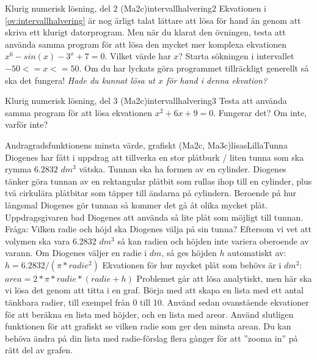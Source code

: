 \begin{matteovnings}{Klurig numerisk lösning, del 2 (Ma2c)}{intervallhalvering2}
Ekvationen i \autoref{ov:intervallhalvering} är nog ärligt talat lättare att lösa för hand än genom att skriva ett klurigt datorprogram. Men när du klarat den övningen, testa att använda samma program för att lösa den mycket mer komplexa ekvationen $x^6 - sin(x) - 3^x + 7 = 0$.
\newline
\newline
Vilket värde har $x$? Starta sökningen i intervallet $-50 <= x <= 50$. Om du har lyckats göra programmet tillräckligt generellt så ska det fungera!
\newline
\newline
\emph{Hade du kunnat lösa ut $x$ för hand i denna ekvation?}
\end{matteovnings}

\begin{matteovnings}{Klurig numerisk lösning, del 3 (Ma2c)}{intervallhalvering3}
Testa att använda samma program för att lösa ekvationen $x^2 + 6x + 9 = 0$. Fungerar det? Om inte, varför inte?
\end{matteovnings}
\newpage
\begin{matteovningm}{Andragradsfunktionens minsta värde, grafiskt (Ma2c, Ma3c)}{lisasLillaTunna}
Diogenes har fått i uppdrag att tillverka en stor plåtburk / liten tunna som ska rymma $6.2832$ $dm^3$ vätska. Tunnan ska ha formen av en cylinder. Diogenes tänker göra tunnan av en rektangular plåtbit som rullas ihop till en cylinder, plus två cirkulära plåtbitar som täpper till ändarna på cylindern. Beroende på hur långsmal Diogenes gör tunnan så kommer det gå åt olika mycket plåt. Uppdragsgivaren bad Diogenes att använda så lite plåt som möjligt till tunnan.
\newline
\newline
Fråga: Vilken radie och höjd ska Diogenes välja på sin tunna?
\newline
\newline
Eftersom vi vet att volymen ska vara $6.2832$ $dm^3$ så kan radien och höjden inte variera oberoende av varann. Om Diogenes väljer en radie i $dm$, så ges höjden $h$ automatiskt av:
\newline
\newline
$h = 6.2832 / (\pi * radie^2)$
\newline
\newline
Ekvationen för hur mycket plåt som behövs är i $dm^2$:
\newline
\newline
$area = 2 * \pi * radie * (radie + h)$
\newline
\newline
Problemet går att lösa analytiskt, men här ska vi lösa det genom att titta i en graf. Börja med att skapa en lista med ett antal tänkbara radier, till exempel från 0 till 10. Använd sedan ovanstående ekvationer för att beräkna en lista med höjder, och en lista med areor. Använd slutligen funktionen  för att grafiskt se vilken radie som ger den minsta arean. Du kan behöva ändra på din lista med radie-förslag flera gånger för att ''zooma in'' på rätt del av grafen.
\end{matteovningm}

